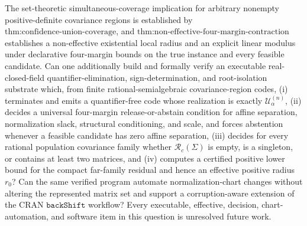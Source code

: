 The set-theoretic simultaneous-coverage implication for arbitrary nonempty positive-definite covariance regions is established by \(\text{thm:confidence-union-coverage}\), and \(\text{thm:non-effective-four-margin-contraction}\) establishes a non-effective existential local radius and an explicit linear modulus under declarative four-margin bounds on the true instance and every feasible candidate. Can one additionally build and formally verify an executable real-closed-field quantifier-elimination, sign-determination, and root-isolation substrate which, from finite rational-semialgebraic covariance-region codes, (i) terminates and emits a quantifier-free code whose realization is exactly \(\mathcal U^{(n)}_\alpha\), (ii) decides a universal four-margin release-or-abstain condition for affine separation, normalization slack, structural conditioning, and scale, and forces abstention whenever a feasible candidate has zero affine separation, (iii) decides for every rational population covariance family whether \(\mathcal R_c(\Sigma)\) is empty, is a singleton, or contains at least two matrices, and (iv) computes a certified positive lower bound for the compact far-family residual and hence an effective positive radius \(r_0\)? Can the same verified program automate normalization-chart changes without altering the represented matrix set and support a corruption-aware extension of the CRAN \(\texttt{backShift}\) workflow? Every executable, effective, decision, chart-automation, and software item in this question is unresolved future work.